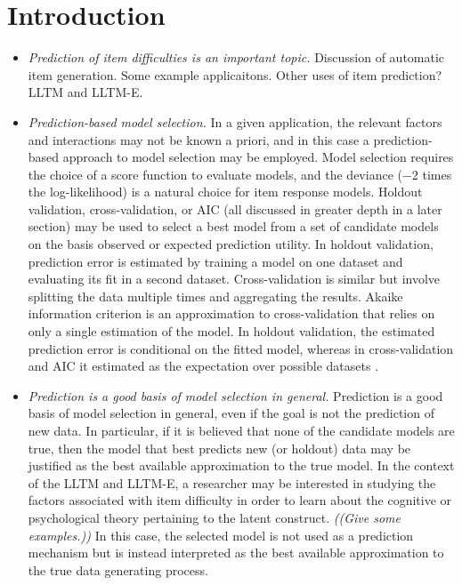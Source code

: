 \section{Introduction}

\begin{itemize}
	
	\item \emph{Prediction of item difficulties is an important topic.} Discussion of automatic item generation. Some example applicaitons. Other uses of item prediction? LLTM and LLTM-E.
	
	\item \emph{Prediction-based model selection.} In a given application, the relevant factors and interactions may not be known a priori, and in this case a prediction-based approach to model selection may be employed. Model selection requires the choice of a score function to evaluate models, and the deviance ($-2$ times the log-likelihood) is a natural choice for item response models. Holdout validation, cross-validation, or AIC (all discussed in greater depth in a later section) may be used to select a best model from a set of candidate models on the basis observed or expected prediction utility. In holdout validation, prediction error is estimated by training a model on one dataset and evaluating its fit in a second dataset. Cross-validation is similar but involve splitting the data multiple times and aggregating the results. Akaike information criterion \parencite[AIC;][]{akaike1974new} is an approximation to cross-validation \parencite{stone1977asymptotic} that relies on only a single estimation of the model. In holdout validation, the estimated prediction error is conditional on the fitted model, whereas in cross-validation and AIC it estimated as the expectation over possible datasets \parencite{Hastie2009}.
	
	\item \emph{Prediction is a good basis of model selection in general.} Prediction is a good basis of model selection in general, even if the goal is not the prediction of new data. In particular, if it is believed that none of the candidate models are true, then the model that best predicts new (or holdout) data may be justified as the best available approximation to the true model. In the context of the LLTM and LLTM-E, a researcher may be interested in studying the factors associated with item difficulty in order to learn about the cognitive or psychological theory pertaining to the latent construct. \emph{((Give some examples.))} In this case, the selected model is not used as a prediction mechanism but is instead interpreted as the best available approximation to the true data generating process.
	

\end{itemize}
